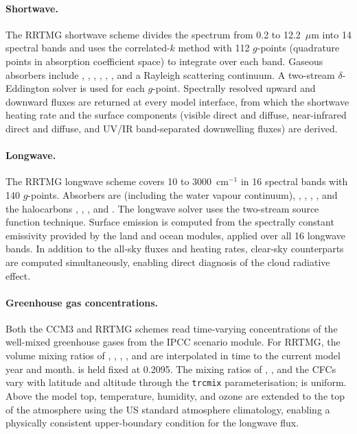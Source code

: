 \paragraph{Shortwave.}
The RRTMG shortwave scheme \citep{Iacono_08} divides the spectrum from
0.2 to 12.2~$\mu$m into 14 spectral bands and uses the correlated-$k$
method with 112 $g$-points (quadrature points in absorption coefficient
space) to integrate over each band.  Gaseous absorbers include ,
, , , , , and a Rayleigh
scattering continuum.  A two-stream $\delta$-Eddington solver is used for
each $g$-point.  Spectrally resolved upward and downward fluxes are
returned at every model interface, from which the shortwave heating rate
and the surface components (visible direct and diffuse, near-infrared
direct and diffuse, and UV/IR band-separated downwelling fluxes) are
derived.

\paragraph{Longwave.}
The RRTMG longwave scheme \citep{Mlawer_97,Iacono_08} covers 10 to
3000~cm$^{-1}$ in 16 spectral bands with 140 $g$-points.  Absorbers are
 (including the water vapour continuum), , ,
, , and the halocarbons , ,
, and .  The longwave solver uses the two-stream
source function technique.  Surface emission is computed from the
spectrally constant emissivity provided by the land and ocean modules,
applied over all 16 longwave bands.  In addition to the all-sky fluxes
and heating rates, clear-sky counterparts are computed simultaneously,
enabling direct diagnosis of the cloud radiative effect.

\paragraph{Greenhouse gas concentrations.}
Both the CCM3 and RRTMG schemes read time-varying concentrations of the
well-mixed greenhouse gases from the IPCC scenario module.  For RRTMG, the
volume mixing ratios of , , , , and
 are interpolated in time to the current model year and month.
 is held fixed at 0.2095.  The mixing ratios of ,
, and the CFCs vary with latitude and altitude through the
\texttt{trcmix} parameterisation;  is uniform.  Above the model
top, temperature, humidity, and ozone are extended to the top of the
atmosphere using the US standard atmosphere climatology, enabling a
physically consistent upper-boundary condition for the longwave flux.

